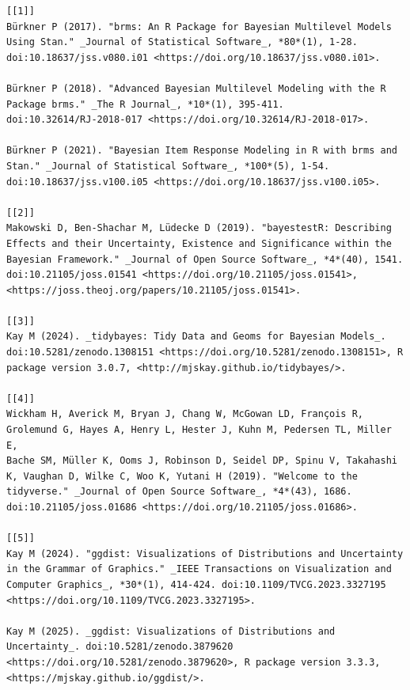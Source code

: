 \documentclass[
  doc,
  floatsintext,
  longtable,
  nolmodern,
  notxfonts,
  notimes,
  colorlinks=true,linkcolor=blue,citecolor=blue,urlcolor=blue]{apa7}
\begin{document}
\begin{verbatim}
[[1]]
Bürkner P (2017). "brms: An R Package for Bayesian Multilevel Models
Using Stan." _Journal of Statistical Software_, *80*(1), 1-28.
doi:10.18637/jss.v080.i01 <https://doi.org/10.18637/jss.v080.i01>.

Bürkner P (2018). "Advanced Bayesian Multilevel Modeling with the R
Package brms." _The R Journal_, *10*(1), 395-411.
doi:10.32614/RJ-2018-017 <https://doi.org/10.32614/RJ-2018-017>.

Bürkner P (2021). "Bayesian Item Response Modeling in R with brms and
Stan." _Journal of Statistical Software_, *100*(5), 1-54.
doi:10.18637/jss.v100.i05 <https://doi.org/10.18637/jss.v100.i05>.

[[2]]
Makowski D, Ben-Shachar M, Lüdecke D (2019). "bayestestR: Describing
Effects and their Uncertainty, Existence and Significance within the
Bayesian Framework." _Journal of Open Source Software_, *4*(40), 1541.
doi:10.21105/joss.01541 <https://doi.org/10.21105/joss.01541>,
<https://joss.theoj.org/papers/10.21105/joss.01541>.

[[3]]
Kay M (2024). _tidybayes: Tidy Data and Geoms for Bayesian Models_.
doi:10.5281/zenodo.1308151 <https://doi.org/10.5281/zenodo.1308151>, R
package version 3.0.7, <http://mjskay.github.io/tidybayes/>.

[[4]]
Wickham H, Averick M, Bryan J, Chang W, McGowan LD, François R,
Grolemund G, Hayes A, Henry L, Hester J, Kuhn M, Pedersen TL, Miller E,
Bache SM, Müller K, Ooms J, Robinson D, Seidel DP, Spinu V, Takahashi
K, Vaughan D, Wilke C, Woo K, Yutani H (2019). "Welcome to the
tidyverse." _Journal of Open Source Software_, *4*(43), 1686.
doi:10.21105/joss.01686 <https://doi.org/10.21105/joss.01686>.

[[5]]
Kay M (2024). "ggdist: Visualizations of Distributions and Uncertainty
in the Grammar of Graphics." _IEEE Transactions on Visualization and
Computer Graphics_, *30*(1), 414-424. doi:10.1109/TVCG.2023.3327195
<https://doi.org/10.1109/TVCG.2023.3327195>.

Kay M (2025). _ggdist: Visualizations of Distributions and
Uncertainty_. doi:10.5281/zenodo.3879620
<https://doi.org/10.5281/zenodo.3879620>, R package version 3.3.3,
<https://mjskay.github.io/ggdist/>.
\end{verbatim}
\end{document}
